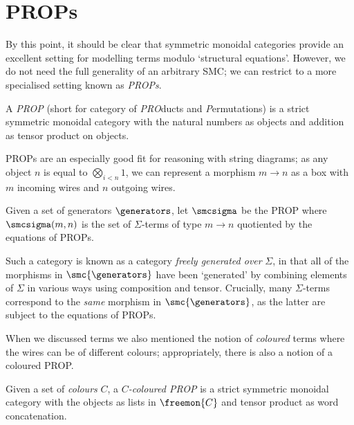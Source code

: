 \section{PROPs}

By this point, it should be clear that symmetric monoidal categories provide
an excellent setting for modelling terms modulo `structural equations'.
However, we do not need the full generality of an arbitrary SMC; we can restrict
to a more specialised setting known as \emph{PROPs}.

\begin{definition}
    A \emph{PROP} (short for category of \emph{PRO}ducts and
    \emph{P}ermutations) is a strict symmetric monoidal category with the
    natural numbers as objects and addition as tensor product on objects.
\end{definition}

PROPs are an especially good fit for reasoning with string diagrams; as any
object \(n\) is equal to \(\bigotimes_{i < n} 1\), we can represent a morphism
\(m \to n\) as a box with \(m\) incoming wires and \(n\) outgoing wires.

\begin{definition}\label{def:freely-generated-prop}
    Given a set of generators \(\generators\), let \(\smcsigma\) be the
    PROP where \(\smcsigma(m, n)\) is the set of \(\Sigma\)-terms of type
    \(m \to n\) quotiented by the equations of PROPs.
\end{definition}

Such a category is known as a category \emph{freely generated over}
\(\Sigma\), in that all of the morphisms in \(\smc{\generators}\) have been
`generated' by combining elements of \(\Sigma\) in various ways using
composition and tensor.
Crucially, many \(\Sigma\)-terms correspond to the \emph{same} morphism in
\(\smc{\generators}\), as the latter are subject to the equations of PROPs.

When we discussed terms we also mentioned the notion of \emph{coloured} terms
where the wires can be of different colours; appropriately, there is also a
notion of a coloured PROP.

\begin{definition}
    Given a set of \emph{colours} \(C\), a \emph{\(C\)-coloured PROP} is a strict
    symmetric monoidal category with the objects as lists in \(\freemon{C}\) and
    tensor product as word concatenation.
\end{definition}

